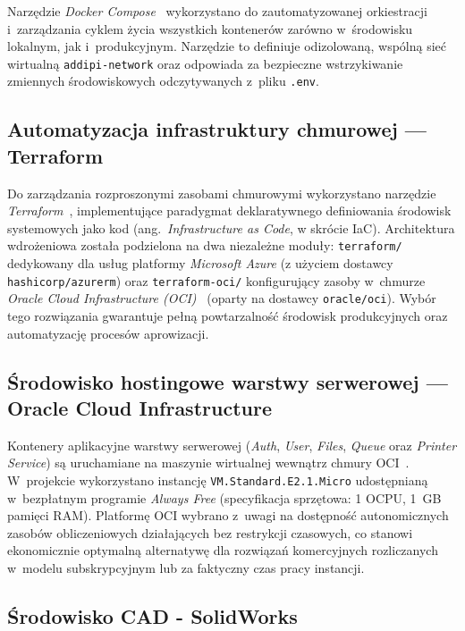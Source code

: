 \documentclass[a4paper,12pt,reqno]{article}
\begin{document}
Narzędzie \textit{Docker Compose}~\cite{docker} wykorzystano do zautomatyzowanej orkiestracji i~zarządzania cyklem życia wszystkich kontenerów zarówno w~środowisku lokalnym, jak i~produkcyjnym. Narzędzie to definiuje odizolowaną, wspólną sieć wirtualną \texttt{addipi-\allowbreak{}network} oraz odpowiada za bezpieczne wstrzykiwanie zmiennych środowiskowych odczytywanych z~pliku \texttt{.env}.

\subsection{Automatyzacja infrastruktury chmurowej --- Terraform}

Do zarządzania rozproszonymi zasobami chmurowymi wykorzystano narzędzie \textit{Terraform}~\cite{terraform}, implementujące paradygmat deklaratywnego definiowania środowisk systemowych jako kod (ang.~\textit{Infrastructure as Code}, w skrócie IaC). Architektura wdrożeniowa została podzielona na dwa niezależne moduły: \texttt{terraform/} dedykowany dla usług platformy \textit{Microsoft Azure} (z użyciem dostawcy \texttt{hashicorp/azurerm}) oraz \texttt{terraform-oci/} konfigurujący zasoby w~chmurze \textit{Oracle Cloud Infrastructure (OCI)}~\cite{oci} (oparty na dostawcy \texttt{oracle/oci}). Wybór tego rozwiązania gwarantuje pełną powtarzalność środowisk produkcyjnych oraz automatyzację procesów aprowizacji.

\subsection{Środowisko hostingowe warstwy serwerowej --- Oracle Cloud Infrastructure}

Kontenery aplikacyjne warstwy serwerowej (\textit{Auth}, \textit{User}, \textit{Files}, \textit{Queue} oraz \textit{Printer Service}) są uruchamiane na maszynie wirtualnej wewnątrz chmury OCI~\cite{oci}. W~projekcie wykorzystano instancję \texttt{VM.Standard.E2.1.Micro} udostępnianą w~bezpłatnym programie \textit{Always Free} (specyfikacja sprzętowa: 1 OCPU, 1~GB pamięci RAM). Platformę OCI wybrano z~uwagi na dostępność autonomicznych zasobów obliczeniowych działających bez restrykcji czasowych, co stanowi ekonomicznie optymalną alternatywę dla rozwiązań komercyjnych rozliczanych w~modelu subskrypcyjnym lub za faktyczny czas pracy instancji.


\subsection{Środowisko CAD - SolidWorks}
\end{document}

